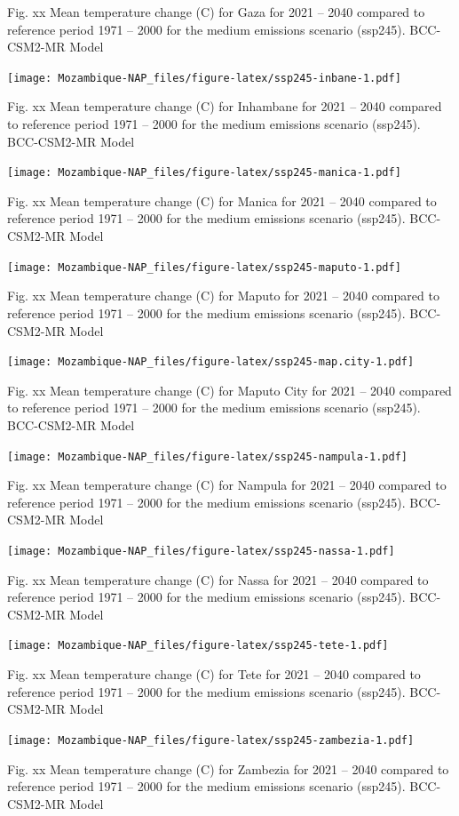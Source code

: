 \documentclass[
]{book}
\begin{document}
Fig. xx Mean temperature change (C) for Gaza for 2021 -- 2040 compared to reference period 1971 -- 2000 for the medium emissions scenario (ssp245). BCC-CSM2-MR Model

\texttt{[image: Mozambique-NAP\_files/figure-latex/ssp245-inbane-1.pdf]}

Fig. xx Mean temperature change (C) for Inhambane for 2021 -- 2040 compared to reference period 1971 -- 2000 for the medium emissions scenario (ssp245). BCC-CSM2-MR Model

\texttt{[image: Mozambique-NAP\_files/figure-latex/ssp245-manica-1.pdf]}

Fig. xx Mean temperature change (C) for Manica for 2021 -- 2040 compared to reference period 1971 -- 2000 for the medium emissions scenario (ssp245). BCC-CSM2-MR Model

\texttt{[image: Mozambique-NAP\_files/figure-latex/ssp245-maputo-1.pdf]}

Fig. xx Mean temperature change (C) for Maputo for 2021 -- 2040 compared to reference period 1971 -- 2000 for the medium emissions scenario (ssp245). BCC-CSM2-MR Model

\texttt{[image: Mozambique-NAP\_files/figure-latex/ssp245-map.city-1.pdf]}

Fig. xx Mean temperature change (C) for Maputo City for 2021 -- 2040 compared to reference period 1971 -- 2000 for the medium emissions scenario (ssp245). BCC-CSM2-MR Model

\texttt{[image: Mozambique-NAP\_files/figure-latex/ssp245-nampula-1.pdf]}

Fig. xx Mean temperature change (C) for Nampula for 2021 -- 2040 compared to reference period 1971 -- 2000 for the medium emissions scenario (ssp245). BCC-CSM2-MR Model

\texttt{[image: Mozambique-NAP\_files/figure-latex/ssp245-nassa-1.pdf]}

Fig. xx Mean temperature change (C) for Nassa for 2021 -- 2040 compared to reference period 1971 -- 2000 for the medium emissions scenario (ssp245). BCC-CSM2-MR Model

\texttt{[image: Mozambique-NAP\_files/figure-latex/ssp245-tete-1.pdf]}

Fig. xx Mean temperature change (C) for Tete for 2021 -- 2040 compared to reference period 1971 -- 2000 for the medium emissions scenario (ssp245). BCC-CSM2-MR Model

\texttt{[image: Mozambique-NAP\_files/figure-latex/ssp245-zambezia-1.pdf]}

Fig. xx Mean temperature change (C) for Zambezia for 2021 -- 2040 compared to reference period 1971 -- 2000 for the medium emissions scenario (ssp245). BCC-CSM2-MR Model
\end{document}
